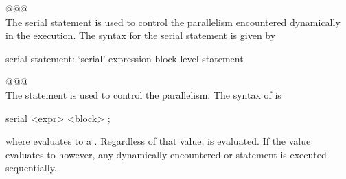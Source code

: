 \noindent @@@\hrulefill \\
The serial statement is used to control the parallelism encountered
dynamically in the execution.  The syntax for the serial statement is
given by
\begin{syntax}
serial-statement:
  `serial' expression block-level-statement
\end{syntax}
\noindent @@@\hrulefill \\

The  statement is used to control the parallelism.
The syntax of  is
\begin{chapel}
serial <expr> <block> ;
\end{chapel}
where  evaluates to a .  Regardless of that
value,  is evaluated. If the value evaluates to
 however, any dynamically encountered  or
 statement is executed sequentially. 

